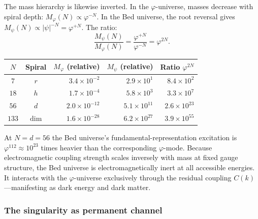 \documentclass[12pt,a4paper]{article}
\newcommand{\bed}{Bed universe}
\begin{document}
The mass hierarchy is likewise inverted.  In the $\varphi$-universe, masses decrease with spiral depth: $M_\varphi(N) \propto \varphi^{-N}$.  In the \bed{}, the root reversal gives $M_\psi(N) \propto |\psi|^{-N} = \varphi^{+N}$.  The ratio:
\begin{equation}
\frac{M_\psi(N)}{M_\varphi(N)} = \frac{\varphi^{+N}}{\varphi^{-N}} = \varphi^{2N}.
\end{equation}

\begin{center}\small
\begin{tabular}{c|c|r|r|r}
$N$ & Spiral & $M_\varphi$ (relative) & $M_\psi$ (relative) & Ratio $\varphi^{2N}$ \\
\hline
$7$  & $r$    & $3.4 \times 10^{-2}$ & $2.9 \times 10^{1}$ & $8.4 \times 10^{2}$ \\
$18$ & $h$    & $1.7 \times 10^{-4}$ & $5.8 \times 10^{3}$ & $3.3 \times 10^{7}$ \\
$56$ & $d$    & $2.0 \times 10^{-12}$ & $5.1 \times 10^{11}$ & $2.6 \times 10^{23}$ \\
$133$& $\dim$ & $1.6 \times 10^{-28}$ & $6.2 \times 10^{27}$ & $3.9 \times 10^{55}$ \\
\end{tabular}
\end{center}

\noindent At $N = d = 56$ the \bed{}'s fundamental-representation excitation is $\varphi^{112} \approx 10^{23}$ times heavier than the corresponding $\varphi$-mode.  Because electromagnetic coupling strength scales inversely with mass at fixed gauge structure, the \bed{} is electromagnetically inert at all accessible energies.  It interacts with the $\varphi$-universe exclusively through the residual coupling $C(k)$---manifesting as dark energy and dark matter.

\subsubsection{The singularity as permanent channel}
\label{sec:psi-channel}
\end{document}
